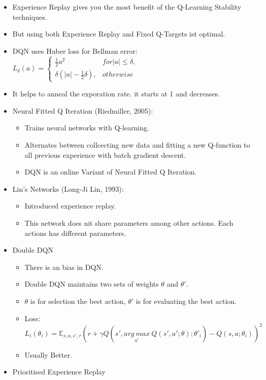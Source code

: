 \begin{itemize}[noitemsep,nolistsep]
	\item Experience Replay gives you the most benefit of the Q-Learning Stability techniques.
	\item But using both Experience Replay and Fixed Q-Targets ist optimal.
	\item DQN uses Huber loss for Bellman error: $L_\delta (a) = \begin{cases} \frac{1}{2}a^2 & for |a| \leq \delta, \\ \delta(|a| - \frac{1}{2}\delta), & otherwise \end{cases}$
	\item It helps to anneal the exporation rate. it starts at 1 and decreases.
	\item Neural Fitted Q Iteration (Riedmiller, 2005):
	\begin{itemize}[noitemsep,nolistsep]
		\item Trains neural networks with Q-learning.
		\item Alternates between collcecting new data and fitting a new Q-function to all previous experience with batch gradient descent.
		\item DQN is an online Variant of Neural Fitted Q Iteration.
	\end{itemize}
	\item Lin's Networks (Long-Ji Lin, 1993):
	\begin{itemize}[noitemsep,nolistsep]
		\item Introduced experience replay.
		\item This network does nit share parameters among other actions. Each actions has different parameters.
	\end{itemize}
	\item Double DQN
	\begin{itemize}[noitemsep,nolistsep]
		\item There is an bias in DQN.
		\item Double DQN maintains two sets of weights $\theta$ and $\theta'$.
		\item $\theta$ is for selection the best action, $\theta'$ is for evaluating the best action.
		\item Loss: $L_i(\theta_i) = \mathbb{E}_{s,a,s',r} (r + \gamma Q(s', \underset{a'}{arg\ max}\ Q(s',a';\theta);\theta'_i) - Q(s,a;\theta_i))^2$
		\item Usually Better.
	\end{itemize}
	\item Prioritised Experience Replay

\end{itemize}
